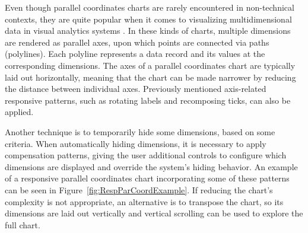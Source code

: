 Even though parallel coordinates charts
\parencite{ParallelCoordinates} are rarely encountered in
non-technical contexts, they are quite popular when it comes to
visualizing multidimensional data in visual analytics systems
\parencite{HighD}. In these kinds of charts, multiple dimensions are
rendered as parallel axes, upon which points are connected via paths
(polylines). Each polyline represents a data record and its values at
the corresponding dimensions. The axes of a parallel coordinates chart
are typically laid out horizontally, meaning that the chart can be
made narrower by reducing the distance between individual axes.
Previously mentioned axis-related responsive patterns, such as
rotating labels and recomposing ticks, can also be applied.

Another technique is to temporarily hide some dimensions, based on
some criteria. When automatically hiding dimensions, it is necessary
to apply compensation patterns, giving the user additional controls to
configure which dimensions are displayed and override the system's
hiding behavior. An example of a responsive parallel coordinates chart
incorporating some of these patterns can be seen in
Figure~\ref{fig:RespParCoordExample}.
%
If reducing the chart's complexity is not appropriate, an alternative
is to transpose the chart, so its dimensions are laid out vertically
and vertical scrolling can be used to explore the full chart.




